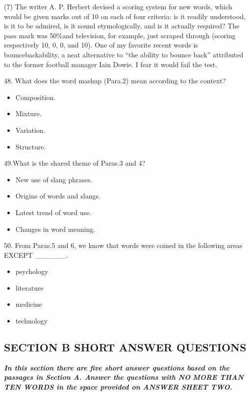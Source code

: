 \documentclass[UTF8,11pt]{ctexart}
\begin{document}
(7) The writer A. P. Herbert devised a scoring system for new words, which would be given marks out of 10 on each of four criteria: is it readily understood, is it to be admired, is it sound etymologically, and is it actually required? The pass mark was 50\%and television, for example, just scraped through (scoring respectively 10, 0, 0, and 10). One of my favorite recent words is bouncebackability, a neat alternative to “the ability to bounce back” attributed to the former football manager Iain Dowie. I fear it would fail the test.


48. What does the word mashup (Para.2) mean according to the context?


\begin{itemize}[leftmargin=2em,itemsep=.2em,topsep=.4em]\item[A.] Composition.
\item[B.] Mixture.
\item[C.] Variation.
\item[D.] Structure.
\end{itemize}

49.What is the shared theme of Paras.3 and 4?


\begin{itemize}[leftmargin=2em,itemsep=.2em,topsep=.4em]\item[A.] New use of slang phrases.
\item[B.] Origins of words and slangs.
\item[C.] Latest trend of word use.
\item[D.] Changes in word meaning.
\end{itemize}

50. From Paras.5 and 6, we know that words were coined in the following areas EXCEPT \_\_\_\_\_\_.


\begin{itemize}[leftmargin=2em,itemsep=.2em,topsep=.4em]\item[A.] psychology
\item[B.] literature
\item[C.] medicine
\item[D.] technology
\end{itemize}

\subsection*{\textbf{SECTION B SHORT ANSWER QUESTIONS}}


\textbf{\textit{In this section there are five short answer questions based on the passages in Section A. Answer the questions with NO}} \textbf{\textit{MORE THAN TEN WORDS in the space provided on ANSWER SHEET TWO.}}
\end{document}

